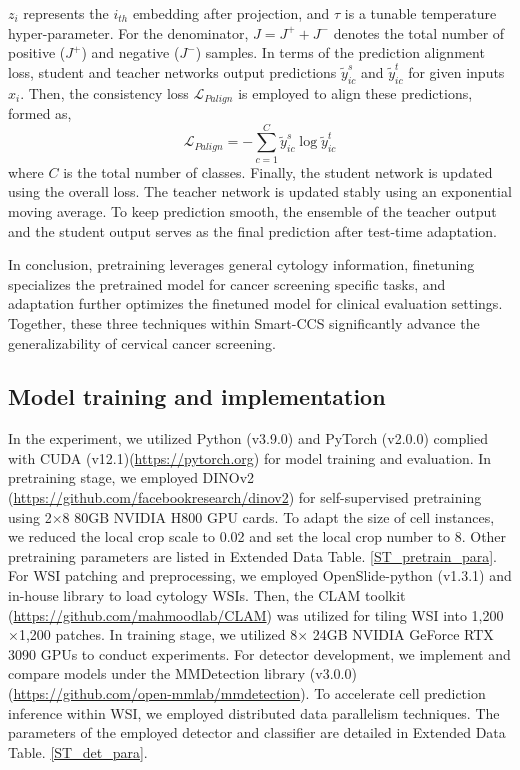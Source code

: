 $z_{i}$ represents the $i_{th}$ embedding after projection, and $\tau$ is a tunable temperature hyper-parameter.
For the denominator, $J=J^{+}+J^{-}$ denotes the total number of positive ($J^{+}$) and negative ($J^{-}$) samples. In terms of the prediction alignment loss, student and teacher networks output predictions $\tilde{y}^{s}_{ic}$ and $\tilde{y}^{t}_{ic}$ for given inputs $x_{i}$. Then, the consistency loss $\mathcal{L}_{Palign}$ is employed to align these predictions, formed as,
 \begin{equation}
\mathcal{L}_{Palign}=  -\sum_{c=1}^C \tilde{y}^{s}_{ic} \log \tilde{y}^{t}_{ic}
 \end{equation}
where $C$ is the total number of classes.
Finally, the student network is updated using the overall loss. The teacher network is updated stably using an exponential moving average. To keep prediction smooth, the ensemble of the teacher output and the student output serves as the final prediction after test-time adaptation.

In conclusion, pretraining leverages general cytology information, finetuning specializes the pretrained model for cancer screening specific tasks, and adaptation further optimizes the finetuned model for clinical evaluation settings. Together, these three techniques within Smart-CCS significantly advance the generalizability of cervical cancer screening.

\subsection*{Model training and implementation}\label{subsec4-6}
In the experiment, we utilized Python (v3.9.0) and PyTorch (v2.0.0) \cite{paszke2019pytorch} complied with CUDA (v12.1)(\url{https://pytorch.org}) for model training and evaluation. In pretraining stage, we employed DINOv2 (\url{https://github.com/facebookresearch/dinov2}) for self-supervised pretraining using 2$\times$8 80GB NVIDIA H800 GPU cards. To adapt the size of cell instances, we reduced the local crop scale to 0.02 and set the local crop number to 8. Other pretraining parameters are listed in Extended Data Table. \ref{ST_pretrain_para}. For WSI patching and preprocessing, we employed OpenSlide-python (v1.3.1) and in-house library to load cytology WSIs. Then, the CLAM toolkit (\url{https://github.com/mahmoodlab/CLAM}) was utilized for tiling WSI into 1,200$\times$1,200 patches. 
In training stage, we utilized 8$\times$ 24GB NVIDIA GeForce RTX 3090 GPUs to conduct experiments. For detector development, we implement and compare models under the MMDetection library (v3.0.0) (\url{https://github.com/open-mmlab/mmdetection}). To accelerate cell prediction inference within WSI, we employed distributed data parallelism techniques. The parameters of the employed detector and classifier are detailed in Extended Data Table. \ref{ST_det_para}.

